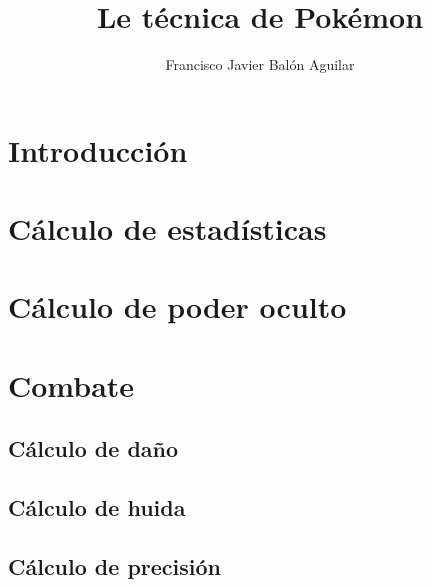 \documentclass[a4paper, 11pt, titlepage]{article}
\title{Le técnica de Pokémon}
\author{Francisco Javier Balón Aguilar}
\begin{document}
\maketitle
\renewcommand{\contentsname}{Índice}
\tableofcontents
\newpage

\section{Introducción}\label{introduccion}

\section{Cálculo de estadísticas}

\section{Cálculo de poder oculto}

\section{Combate}

    \subsection{Cálculo de daño}

    \subsection{Cálculo de huida}

    \subsection{Cálculo de precisión}
\end{document}
